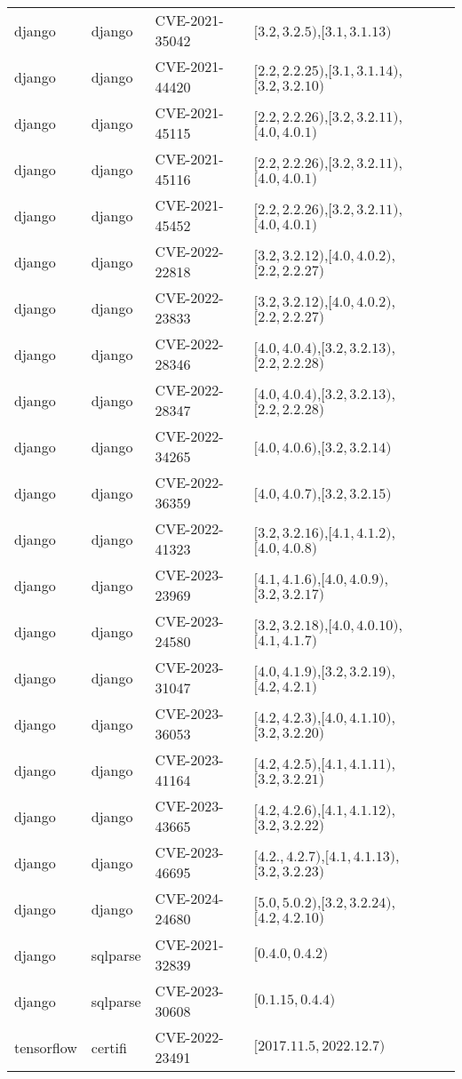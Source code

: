 \begin{tabular}{llll}
django & django & CVE-2021-35042 & $[3.2,3.2.5)$,$[3.1,3.1.13)$ \\
django & django & CVE-2021-44420 & $[2.2,2.2.25)$,$[3.1,3.1.14)$,$[3.2,3.2.10)$ \\
django & django & CVE-2021-45115 & $[2.2,2.2.26)$,$[3.2,3.2.11)$,$[4.0,4.0.1)$ \\
django & django & CVE-2021-45116 & $[2.2,2.2.26)$,$[3.2,3.2.11)$,$[4.0,4.0.1)$ \\
django & django & CVE-2021-45452 & $[2.2,2.2.26)$,$[3.2,3.2.11)$,$[4.0,4.0.1)$ \\
django & django & CVE-2022-22818 & $[3.2,3.2.12)$,$[4.0,4.0.2)$,$[2.2,2.2.27)$ \\
django & django & CVE-2022-23833 & $[3.2,3.2.12)$,$[4.0,4.0.2)$,$[2.2,2.2.27)$ \\
django & django & CVE-2022-28346 & $[4.0,4.0.4)$,$[3.2,3.2.13)$,$[2.2,2.2.28)$ \\
django & django & CVE-2022-28347 & $[4.0,4.0.4)$,$[3.2,3.2.13)$,$[2.2,2.2.28)$ \\
django & django & CVE-2022-34265 & $[4.0,4.0.6)$,$[3.2,3.2.14)$ \\
django & django & CVE-2022-36359 & $[4.0,4.0.7)$,$[3.2,3.2.15)$ \\
django & django & CVE-2022-41323 & $[3.2,3.2.16)$,$[4.1,4.1.2)$,$[4.0,4.0.8)$ \\
django & django & CVE-2023-23969 & $[4.1,4.1.6)$,$[4.0,4.0.9)$,$[3.2,3.2.17)$ \\
django & django & CVE-2023-24580 & $[3.2,3.2.18)$,$[4.0,4.0.10)$,$[4.1,4.1.7)$ \\
django & django & CVE-2023-31047 & $[4.0,4.1.9)$,$[3.2,3.2.19)$,$[4.2,4.2.1)$ \\
django & django & CVE-2023-36053 & $[4.2,4.2.3)$,$[4.0,4.1.10)$,$[3.2,3.2.20)$ \\
django & django & CVE-2023-41164 & $[4.2,4.2.5)$,$[4.1,4.1.11)$,$[3.2,3.2.21)$ \\
django & django & CVE-2023-43665 & $[4.2,4.2.6)$,$[4.1,4.1.12)$,$[3.2,3.2.22)$ \\
django & django & CVE-2023-46695 & $[4.2.,4.2.7)$,$[4.1,4.1.13)$,$[3.2,3.2.23)$ \\
django & django & CVE-2024-24680 & $[5.0,5.0.2)$,$[3.2,3.2.24)$,$[4.2,4.2.10)$ \\
django & sqlparse & CVE-2021-32839 & $[0.4.0,0.4.2)$ \\
django & sqlparse & CVE-2023-30608 & $[0.1.15,0.4.4)$ \\
tensorflow & certifi & CVE-2022-23491 & $[2017.11.5,2022.12.7)$ \\

\end{tabular}
